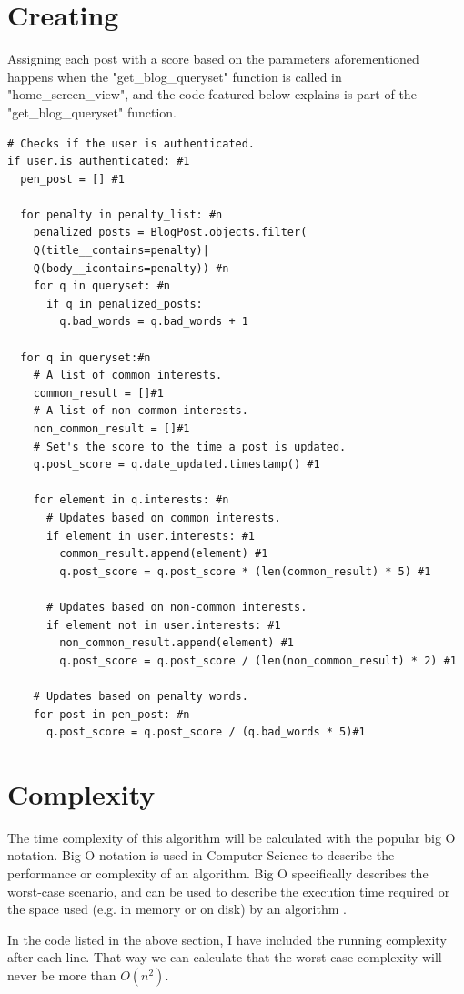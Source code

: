 \section {Creating}

Assigning each post with a score based on the parameters aforementioned happens when the "get\_blog\_queryset" function is called in "home\_screen\_view", and the code featured below explains is part of the "get\_blog\_queryset" function.


\lstset{language=Python}
\lstset{frame=lines}
\begin{lstlisting}
# Checks if the user is authenticated.
if user.is_authenticated: #1
  pen_post = [] #1

  for penalty in penalty_list: #n
    penalized_posts = BlogPost.objects.filter(
    Q(title__contains=penalty)|
    Q(body__icontains=penalty)) #n
    for q in queryset: #n
      if q in penalized_posts:
        q.bad_words = q.bad_words + 1

  for q in queryset:#n
    # A list of common interests.
    common_result = []#1
    # A list of non-common interests.
    non_common_result = []#1
    # Set's the score to the time a post is updated.
    q.post_score = q.date_updated.timestamp() #1

    for element in q.interests: #n
      # Updates based on common interests.
      if element in user.interests: #1
        common_result.append(element) #1
        q.post_score = q.post_score * (len(common_result) * 5) #1

      # Updates based on non-common interests.
      if element not in user.interests: #1
        non_common_result.append(element) #1
        q.post_score = q.post_score / (len(non_common_result) * 2) #1

    # Updates based on penalty words.
    for post in pen_post: #n
      q.post_score = q.post_score / (q.bad_words * 5)#1
\end{lstlisting}

\section{Complexity}

The time complexity of this algorithm will be calculated with the popular big O notation. Big O notation is used in Computer Science to describe the performance or complexity of an algorithm. Big O specifically describes the worst-case scenario, and can be used to describe the execution time required or the space used (e.g. in memory or on disk) by an algorithm \cite{bell_2009_a}.

In the code listed in the above section, I have included the running complexity after each line. That way we can calculate that the worst-case complexity will never be more than $O(n^2)$.
